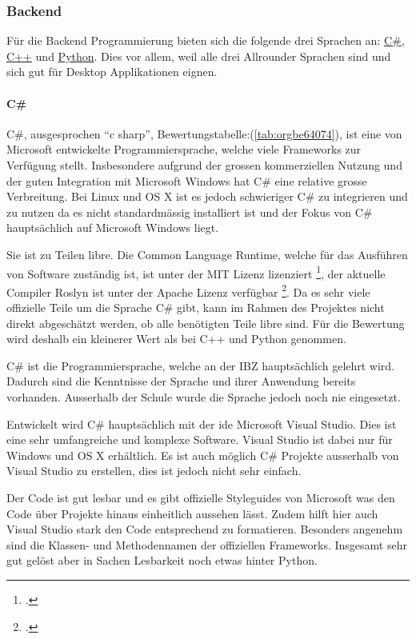 \subsubsection{Backend}
\label{sec:org7487082}

Für die Backend Programmierung bieten sich die folgende drei Sprachen an: \hyperref[sec:org88a8f6c]{C\#},
\hyperref[sec:orga42458f]{C++} und \hyperref[sec:org5438e66]{Python}. Dies vor allem, weil alle drei Allrounder Sprachen sind und sich
gut für Desktop Applikationen eignen.

\paragraph{C\#}
\label{sec:org88a8f6c}

C\#, ausgesprochen "`c sharp"', Bewertungstabelle:(\ref{tab:orgbe64074}), ist
eine von Microsoft entwickelte Programmiersprache, welche viele Frameworks zur
Verfügung stellt. Insbesondere aufgrund der grossen kommerziellen Nutzung und
der guten Integration mit Microsoft Windows hat C\# eine relative grosse
Verbreitung. Bei Linux und OS X ist es jedoch schwieriger C\# zu integrieren
und zu nutzen da es nicht standardmässig installiert ist und der Fokus von C\#
hauptsächlich auf Microsoft Windows liegt.

Sie ist zu Teilen \gls{libre}. Die Common Language Runtime, welche für das
Ausführen von Software zuständig ist, ist unter der MIT Lizenz lizenziert
\footcite{csharp}, der aktuelle Compiler Roslyn ist unter der Apache Lizenz
verfügbar \footcite{roslyn}. Da es sehr viele offizielle Teile um die Sprache C\#
gibt, kann im Rahmen des Projektes nicht direkt abgeschätzt werden, ob alle
benötigten Teile \gls{libre} sind. Für die Bewertung wird deshalb ein kleinerer
Wert als bei C++ und Python genommen.

C\# ist die Programmiersprache, welche an der IBZ hauptsächlich gelehrt wird.
Dadurch sind die Kenntnisse der Sprache und ihrer Anwendung bereits vorhanden.
Ausserhalb der Schule wurde die Sprache jedoch noch nie eingesetzt.

Entwickelt wird C\# hauptsächlich mit der \gls{ide} Microsoft Visual Studio. Dies
ist eine sehr umfangreiche und komplexe Software. Visual Studio ist dabei nur
für Windows und OS X erhältlich. Es ist auch möglich C\# Projekte ausserhalb von
Visual Studio zu erstellen, dies ist jedoch nicht sehr einfach.

Der Code ist gut lesbar und es gibt offizielle Styleguides von Microsoft was
den Code über Projekte hinaus einheitlich aussehen lässt. Zudem
hilft hier auch Visual Studio stark den Code entsprechend zu formatieren.
Besonders angenehm sind die Klassen- und Methodennamen der offiziellen
Frameworks. Insgesamt sehr gut gelöst aber in Sachen Lesbarkeit noch etwas
hinter Python.

